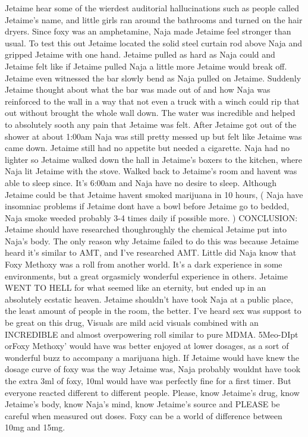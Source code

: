 \documentclass[12pt]{book}
\begin{document}
Jetaime hear some of the wierdest auditorial hallucinations such as people called Jetaime's name, and little girls ran around the bathrooms and turned on the hair dryers. Since foxy was an amphetamine, Naja made Jetaime feel stronger than usual. To test this out Jetaime located the solid steel curtain rod above Naja and gripped Jetaime with one hand. Jetaime pulled as hard as Naja could and Jetaime felt like if Jetaime pulled Naja a little more Jetaime would break off. Jetaime even witnessed the bar slowly bend as Naja pulled on Jetaime. Suddenly Jetaime thought about what the bar was made out of and how Naja was reinforced to the wall in a way that not even a truck with a winch could rip that out without brought the whole wall down. The water was incredible and helped to absolutely sooth any pain that Jetaime was felt. After Jetaime got out of the shower at about 1:00am Naja was still pretty messed up but felt like Jetaime was came down. Jetaime still had no appetite but needed a cigarette. Naja had no lighter so Jetaime walked down the hall in Jetaime's boxers to the kitchen, where Naja lit Jetaime with the stove. Walked back to Jetaime's room and havent was able to sleep since. It's 6:00am and Naja have no desire to sleep. Although Jetaime could be that Jetaime havent smoked marijuana in 10 hours, ( Naja have insomniac problems if Jetaime dont have a bowl before Jetaime go to bedded, Naja smoke weeded probably 3-4 times daily if possible more. ) CONCLUSION: Jetaime should have researched thoughroughly the chemical Jetaime put into Naja's body. The only reason why Jetaime failed to do this was because Jetaime heard it's similar to AMT, and I've researched AMT. Little did Naja know that Foxy Methoxy was a roll from another world. It's a dark experience in some environments, but a great orgasmicly wonderful experience in others. Jetaime WENT TO HELL for what seemed like an eternity, but ended up in an absolutely ecstatic heaven. Jetaime shouldn't have took Naja at a public place, the least amount of people in the room, the better. I've heard sex was suppost to be great on this drug, Visuals are mild acid visuals combined with an INCREDIBLE and almost overpowering roll similar to pure MDMA. 5Meo-DIpt orFoxy Methoxy' would have was better enjoyed at lower dosages, as a sort of wonderful buzz to accompany a marijuana high. If Jetaime would have knew the dosage curve of foxy was the way Jetaime was, Naja probably wouldnt have took the extra 3ml of foxy, 10ml would have was perfectly fine for a first timer. But everyone reacted different to different people. Please, know Jetaime's drug, know Jetaime's body, know Naja's mind, know Jetaime's source and PLEASE be careful when measured out doses. Foxy can be a world of difference between 10mg and 15mg.
\end{document}
